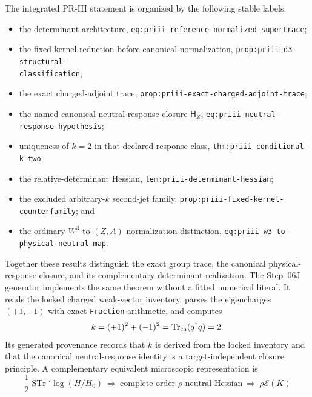 The integrated PR-III statement is organized by the following stable labels:
\begin{itemize}
 \item the determinant architecture,
 \texttt{eq:priii-reference-normalized-supertrace};
 \item the fixed-kernel reduction before canonical normalization,
 \texttt{prop:priii-d3-structural-}\\[-0.25em]
 \hspace*{1.5em}\texttt{classification};
 \item the exact charged-adjoint trace,
 \texttt{prop:priii-exact-charged-adjoint-trace};
 \item the named canonical neutral-response closure $\mathsf H_Z$,
 \texttt{eq:priii-neutral-response-hypothesis};
 \item uniqueness of $k=2$ in that declared response class,
 \texttt{thm:priii-conditional-k-two};
 \item the relative-determinant Hessian,
 \texttt{lem:priii-determinant-hessian};
 \item the excluded arbitrary-$k$ second-jet family,
 \texttt{prop:priii-fixed-kernel-}\\[-0.25em]
 \hspace*{1.5em}\texttt{counterfamily}; and
 \item the ordinary $W^3$-to-$(Z,A)$ normalization distinction,
 \texttt{eq:priii-w3-to-physical-neutral-map}.
\end{itemize}
Together these results distinguish the exact group trace, the canonical physical-response closure, and its complementary determinant realization. The Step~06J generator implements the same theorem without a fitted numerical literal.  It reads the locked charged weak-vector inventory, parses the eigencharges $(+1,-1)$ with exact \texttt{Fraction} arithmetic, and computes
\begin{equation}
 k=(+1)^2+(-1)^2
 =\operatorname{Tr}_{\rm ch}(q^\dagger q)=2.
 \label{eq:pr35-d3-current-generator-trace}
\end{equation}
Its generated provenance records that $k$ is derived from the locked inventory and that the canonical neutral-response identity is a target-independent closure principle. A complementary equivalent microscopic representation is
\begin{equation}
 \frac12\operatorname{STr}'\log(H/H_0)
 \ \Longrightarrow\ \text{complete order-}\rho\text{ neutral Hessian}
 \ \Longrightarrow\ \rho\mathcal E(K)
 \label{eq:pr35-d3-missing-source-edge}
\end{equation}
